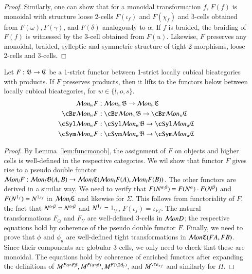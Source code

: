 \begin{proof}

Similarly, one can show that for a monoidal transformation $f$, $F(f)$ is monoidal with structure loose 2-cells $F(\iota_f)$ and $F(\chi_f)$ and 3-cells obtained from $F(\omega),  F(\gamma)$, and $F(\delta)$ analogously to $\alpha$. If $f$ is braided, the braiding of $F(f)$ is witnessed by the 3-cell obtained from $F(u)$. Likewise, $F$ preserves any monoidal, braided, sylleptic and symmetric structure of tight 2-morphisms, loose 2-cells and 3-cells. 
 \end{proof}

\begin{thm}\label{thm:lcbcfunctor}
  Let $F: \mathfrak{B}  \rightarrow \mathfrak{C}$ be a 1-strict functor between 1-strict locally cubical bicategories with products.
  If $F$ preserves products, then it lifts to the functors below between locally cubical bicategories, for $w \in \{l,o,s\}$.
\begin{align*}
\cM on_wF &: \cM on_w \fB  \rightarrow \cM on_w\fC\\ 
\cBr \cM on_w F &: \cBr \cM on_w \fB  \rightarrow \cBr \cM on_w\fC\\
 \cSyl \cM on_wF &: \cSyl \cM on_w \fB  \rightarrow \cSyl \cM on_w\fC\\
\cSym \cM on_wF &: \cSym \cM on_w \fB  \rightarrow \cSym \cM on_w\fC
\end{align*}
\end{thm}

\begin{proof}
By Lemma~\ref{lem:funcmonob}, the assignment of $F$ on objects and higher cells is well-defined in the respective categories.
We wil show that functor $F$ gives rise to a pseudo double functor $\mathcal{M} on_lF: \mathcal{M} on_l \mathfrak{B}(A, B)  \rightarrow \mathcal{M} on_l\mathfrak{C}(\mathcal{M} on_lF(A), \mathcal{M} on_lF(B))$. The other functors are derived in a similar way. We need to verify that $F(N^{\alpha \cdot \beta}) = F(N^{\alpha}) \cdot F(N^{\beta})$ and $F(N^{1_f}) = N^{1_{Ff}}$ in $\mathcal{M} on_l\mathfrak{C}$ and likewise for $\Sigma$. This follows from functoriality of $F$, the fact that $N^{\alpha \cdot \beta} = N^{\alpha \cdot \beta}$ and $N^{1_f} = 1_{\iota_f}$, $F(\iota_f) = \iota_{Ff}$.
The natural transformations $F_{\odot}$ and $F_U$ are well-defined 3-cells in $\mathcal{M} onD$; the respective equations hold by coherence of the pseudo double functor $F$.
Finally, we need to prove that $\phi$ and $\phi_u$ are well-defined tight transformations in $\mathcal{M} on \mathfrak{C}(F A, F B)$. Since their components are globular 3-cells, we only need to check that these are monoidal. The equations hold by coherence of enriched functors after expanding the definitions of $M^{F\alpha \comp F \beta}, M^{F(\alpha \comp \beta)}, M^{F(\looseid_f)}$, and $M^{\looseid_{F f}}$ and similarly for $\Pi$.
\end{proof}

